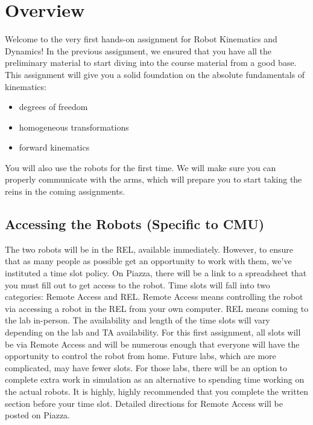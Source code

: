 \documentclass{16384_doc}
\begin{document}
\maketitle

\tableofcontents

\section{Overview}
Welcome to the very first hands-on assignment for Robot Kinematics and Dynamics!  In the previous assignment, we ensured that you have all the preliminary material to start diving into the course material from a good base.  This assignment will give you a solid foundation on the absolute fundamentals of kinematics:

\begin{itemize}
    \item degrees of freedom
    \item homogeneous transformations
    \item forward kinematics
\end{itemize}

You will also use the robots for the first time. We will make sure you can
properly communicate with the arms, which will prepare you to start taking the
reins in the coming assignments.

\subsection{Accessing the Robots (Specific to CMU)}

The two robots will be in the REL, available immediately. However, to ensure that
as many people as possible get an opportunity to work with them, we've instituted a time slot
policy.  On Piazza, there will be a link to a spreadsheet that you must fill out
to get access to the robot. Time slots will fall into two categories: Remote Access  
and REL. Remote Access means controlling the robot via accessing a robot in 
the REL from your own computer. REL means coming to the lab in-person. The availability and 
length of the time slots will vary depending on the lab and TA availability. For this first
assignment, all slots will be via Remote Access and will be numerous enough that everyone
will have the opportunity to control the robot from home. Future labs, which are more complicated,
may have fewer slots. For those labs, there will be an option to complete extra work in simulation
as an alternative to spending time working on the actual robots. It is highly, highly recommended 
that you complete the written section before your time slot. Detailed directions for Remote Access
will be posted on Piazza.
\end{document}
